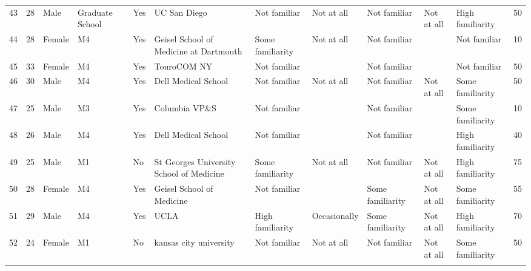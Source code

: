 \documentclass[11pt]{article}
\begin{document}
\begin{landscape}
{\begin{longtable}{rlllllllllll}
43 & 28 & Male & Graduate School & Yes & UC San Diego & Not familiar & Not at all & Not familiar & Not at all & High familiarity & 50 \\
44 & 28 & Female & M4 & Yes & Geisel School of Medicine at Dartmouth & Some familiarity & Not at all & Not familiar &  & Not familiar & 10 \\
45 & 33 & Female & M4 & Yes & TouroCOM NY & Not familiar &  & Not familiar &  & Not familiar & 50 \\
46 & 30 & Male & M4 & Yes & Dell Medical School & Not familiar & Not at all & Not familiar & Not at all & Some familiarity & 50 \\
47 & 25 & Male & M3 & Yes & Columbia VP\&S & Not familiar &  & Not familiar &  & Some familiarity & 10 \\
48 & 26 & Male & M4 & Yes & Dell Medical School & Not familiar &  & Not familiar &  & High familiarity & 40 \\
49 & 25 & Male & M1 & No & St Georges University School of Medicine & Some familiarity & Not at all & Not familiar & Not at all & High familiarity & 75 \\
50 & 28 & Female & M4 & Yes & Geisel School of Medicine & Not familiar &  & Some familiarity & Not at all & Some familiarity & 55 \\
51 & 29 & Male & M4 & Yes & UCLA & High familiarity & Occasionally & Some familiarity & Not at all & High familiarity & 70 \\
52 & 24 & Female & M1 & No & kansas city university & Not familiar & Not at all & Not familiar & Not at all & Some familiarity & 50 \\
\label{demographic}
\end{longtable}
}
\end{landscape}
\end{document}
